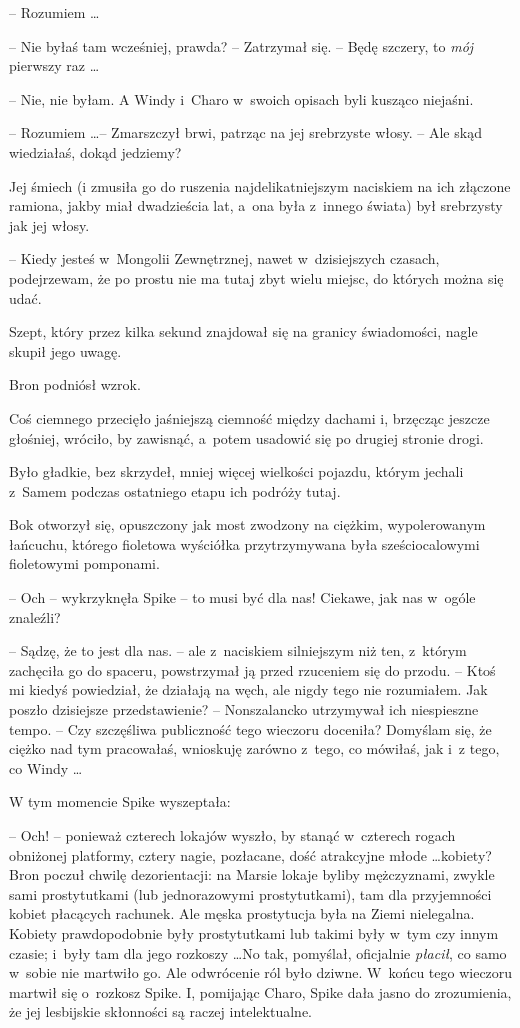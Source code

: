 \documentclass[oneside,polish,11pt,rmheadings]{mwbk}
\begin{document}
-- Rozumiem  \ldots  

-- Nie byłaś tam wcześniej, prawda? -- Zatrzymał się. -- Będę szczery, to \textit{ mój  }pierwszy raz \ldots  

-- Nie, nie byłam. A Windy i~Charo w~swoich opisach byli kusząco niejaśni. 

-- Rozumiem  \ldots -- Zmarszczył brwi, patrząc na jej srebrzyste włosy. -- Ale skąd wiedziałaś, dokąd jedziemy? 

Jej śmiech (i zmusiła go do ruszenia najdelikatniejszym naciskiem na ich złączone ramiona, jakby miał dwadzieścia lat, a~ona była z~innego świata) był srebrzysty jak jej włosy. 

-- Kiedy jesteś w~Mongolii Zewnętrznej, nawet w~dzisiejszych czasach, podejrzewam, że po prostu nie ma tutaj zbyt wielu miejsc, do których można się udać. 

Szept, który przez kilka sekund znajdował się na granicy świadomości, nagle skupił jego uwagę. 

Bron podniósł wzrok. 

Coś ciemnego przecięło jaśniejszą ciemność między dachami i, brzęcząc jeszcze głośniej, wróciło, by zawisnąć, a~potem usadowić się po drugiej stronie drogi. 

Było gładkie, bez skrzydeł, mniej więcej wielkości pojazdu, którym jechali z~Samem podczas ostatniego etapu ich podróży tutaj. 

Bok otworzył się, opuszczony jak most zwodzony na ciężkim, wypolerowanym łańcuchu, którego fioletowa wyściółka przytrzymywana była sześciocalowymi fioletowymi pomponami. 

-- Och -- wykrzyknęła Spike -- to musi być dla nas! Ciekawe, jak nas w~ogóle znaleźli? 

-- Sądzę, że to jest dla nas. -- ale z~naciskiem silniejszym niż ten, z~którym zachęciła go do spaceru, powstrzymał ją przed rzuceniem się do przodu. -- Ktoś mi kiedyś powiedział, że działają na węch, ale nigdy tego nie rozumiałem. Jak poszło dzisiejsze przedstawienie? -- Nonszalancko utrzymywał ich niespieszne tempo. -- Czy szczęśliwa publiczność tego wieczoru doceniła? Domyślam się, że ciężko nad tym pracowałaś, wnioskuję zarówno z~tego, co mówiłaś, jak i~z tego, co Windy \ldots  

W tym momencie Spike wyszeptała: 

-- Och! -- ponieważ czterech lokajów wyszło, by stanąć w~czterech rogach obniżonej platformy, cztery nagie, pozłacane, dość atrakcyjne młode \ldots  kobiety? Bron poczuł chwilę dezorientacji: na Marsie lokaje byliby mężczyznami, zwykle sami prostytutkami (lub jednorazowymi prostytutkami), tam dla przyjemności kobiet płacących rachunek. Ale męska prostytucja była na Ziemi nielegalna. Kobiety prawdopodobnie były prostytutkami lub takimi były w~tym czy innym czasie; i~były tam dla jego rozkoszy \ldots  No tak, pomyślał, oficjalnie \textit{płacił}, co samo w~sobie nie martwiło go. Ale odwrócenie ról było dziwne. W~końcu tego wieczoru martwił się o~rozkosz Spike. I, pomijając Charo, Spike dała jasno do zrozumienia, że jej lesbijskie skłonności są raczej intelektualne. 
\end{document}
